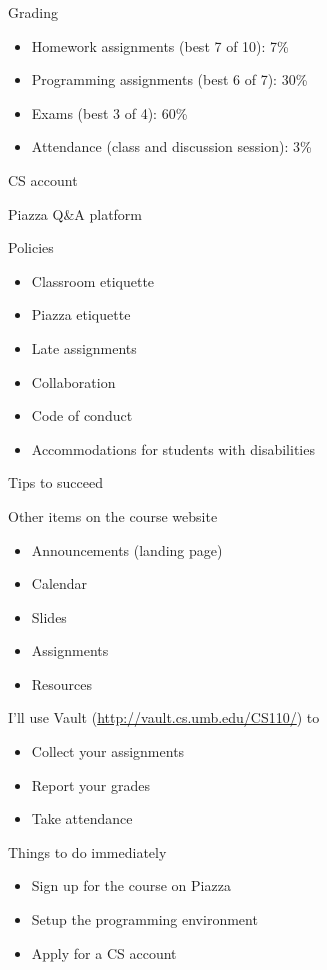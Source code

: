 \documentclass[8pt,a4paper,compress]{beamer}
\begin{document}
\begin{frame}[fragile]
Grading
\begin{itemize}
\item Homework assignments (best 7 of 10): 7\%
\item Programming assignments (best 6 of 7): 30\%
\item Exams (best 3 of 4): 60\%
\item Attendance (class and discussion session): 3\%
\end{itemize}

\bigskip

CS account

\bigskip

Piazza Q\&A platform

\bigskip

Policies
\begin{itemize}
\item Classroom etiquette
\item Piazza etiquette
\item Late assignments
\item Collaboration
\item Code of conduct
\item Accommodations for students with disabilities
\end{itemize}
\end{frame}

\begin{frame}[fragile]
Tips to succeed

\bigskip

Other items on the course website
\begin{itemize}
\item Announcements (landing page)
\item Calendar
\item Slides 
\item Assignments
\item Resources
\end{itemize}

\bigskip

I'll use Vault (\href{http://vault.cs.umb.edu/CS110/}{http://vault.cs.umb.edu/CS110/}) to
\begin{itemize}
\item Collect your assignments
\item Report your grades
\item Take attendance
\end{itemize}

\bigskip

Things to do immediately
\begin{itemize}
\item Sign up for the course on Piazza
\item Setup the programming environment
\item Apply for a CS account
\end{itemize}
\end{frame}
\end{document}
